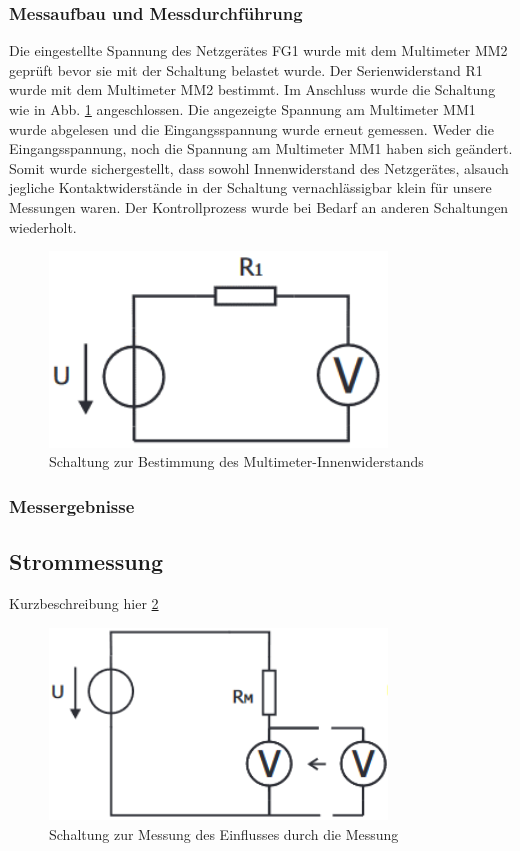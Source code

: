 \documentclass[a4paper]{article}
\begin{document}
\subsubsection{Messaufbau und Messdurchführung}
Die eingestellte Spannung des Netzgerätes FG1 wurde mit dem Multimeter MM2 
geprüft bevor sie mit der Schaltung belastet wurde. Der Serienwiderstand R1 wurde
mit dem Multimeter MM2 bestimmt.
Im Anschluss wurde die Schaltung wie in Abb. \ref{fig:RiVM} angeschlossen.
Die angezeigte Spannung am Multimeter MM1 wurde abgelesen und die Eingangsspannung
wurde erneut gemessen. Weder die Eingangsspannung, noch die Spannung am Multimeter
MM1 haben sich geändert. Somit wurde sichergestellt, dass sowohl Innenwiderstand
des Netzgerätes, alsauch jegliche Kontaktwiderstände in der Schaltung
vernachlässigbar klein für unsere Messungen waren.\newline
Der Kontrollprozess wurde bei Bedarf an anderen Schaltungen wiederholt.

\begin{figure}[h]
	\centering
	\includegraphics[width=0.8\textwidth]{schematics/1a_RiVM.png}
	\caption{Schaltung zur Bestimmung des Multimeter-Innenwiderstands}
	\label{fig:RiVM}
\end{figure}

\subsubsection{Messergebnisse}


\subsection{Strommessung}
Kurzbeschreibung hier \ref{fig:EinlussVM}
\begin{figure}[h]
	\centering
	\includegraphics[width=0.8\textwidth]{schematics/1b_EinflussVM.png}
	\caption{Schaltung zur Messung des Einflusses durch die Messung}
	\label{fig:EinlussVM}
\end{figure}
\end{document}
